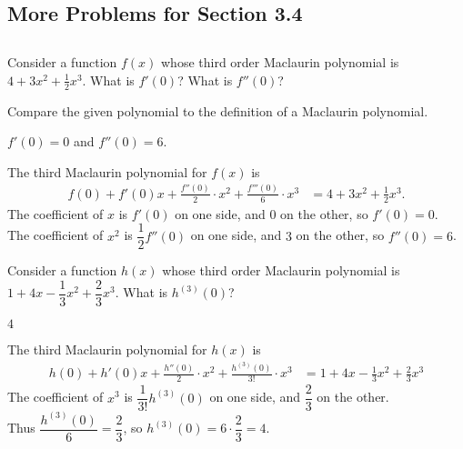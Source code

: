 %
%
\subsection*{More Problems for Section 3.4}
\subsection*{\Conceptual}


\begin{question}[2015Q]
Consider a function $f(x)$ whose third order Maclaurin polynomial is $4 +
3x^2 + \frac{1}{2}x^3$.
 What is $f'(0)$? What is $f''(0)$?
\end{question}
\begin{hint} Compare the given polynomial to the definition of a Maclaurin polynomial.
\end{hint}
\begin{answer} $f'(0)=0$ and $f''(0)=6$.
\end{answer}
\begin{solution}
The third Maclaurin polynomial for $f(x)$ is
\begin{align*}
f(0) + f'(0)x +\frac{f''(0)}{2}\cdot x^2 + \frac{f'''(0)}{6}\cdot x^3
&=4+3x^2+\frac{1}{2}x^3.
\end{align*}
The coefficient of $x$ is $f'(0)$ on  one side, and $0$ on the other, so
 $f'(0)=0$.\\
 The coefficient of $x^2$ is $\dfrac{1}{2}f''(0)$ on  one side, and $3$ on the other, so
 $f''(0)=6$.
\end{solution}


\begin{question}[2015Q]
Consider a function $h(x)$ whose third order Maclaurin polynomial is
$1+4x-\dfrac{1}{3}x^2 + \dfrac{2}{3}x^3$. What is $h^{(3)}(0)$?
\end{question}
\begin{answer}
$4$
\end{answer}
\begin{solution}
The third Maclaurin polynomial for $h(x)$ is
\begin{align*}
    h(0) + h'(0)x +\frac{h''(0)}{2}\cdot x^2 + \frac{h^{(3)}(0)}{3!}\cdot x^3
    &= 1+4x-\frac{1}{3}x^2 + \frac{2}{3}x^3
\end{align*}
 The coefficient of $x^3$ is $\dfrac{1}{3!}h^{(3)}(0)$ on  one side, and $\dfrac{2}{3}$ on the other. \\ Thus $ \dfrac{h^{(3)}(0)}{6}=\dfrac{2}{3}$, so $h^{(3)}(0)=6\cdot\dfrac{2}{3} = 4$.
\end{solution}




